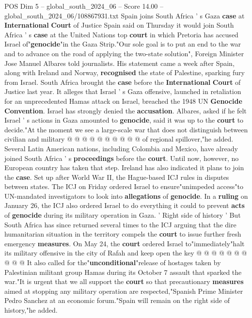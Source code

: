 \begin{textsample}{POS Dim 5 – global\_south\_2024\_06 – Score 14.00 – global\_south\_2024\_06/108867931.txt}  \label{ex:f5_pos_227}
Spain joins South Africa ' s Gaza \textbf{case} at \textbf{International} \textbf{Court} of Justice Spain said on Thursday it would join South Africa ' s \textbf{case} at the United Nations top \textbf{court} in which Pretoria has accused Israel of"\textbf{genocide}"in the Gaza Strip."Our sole goal is to put an end to the war and to advance on the road of applying the two-state solution", Foreign Minister Jose Manuel Albares told journalists.
His statement came a week after Spain, along with Ireland and Norway, \textbf{recognised} the state of Palestine, sparking fury from Israel.
South Africa brought the \textbf{case} before the \textbf{International} \textbf{Court} of Justice last year.
It alleges that Israel ' s Gaza offensive, launched in retaliation for an unprecedented Hamas attack on Israel, breached the 1948 UN \textbf{Genocide} \textbf{Convention}.
Israel has strongly denied the \textbf{accusation}.
Albares, asked if he felt Israel ' s actions in Gaza amounted to \textbf{genocide}, said it was up to the \textbf{court} to decide."At the moment we see a large-scale war that does not distinguish between civilian and military @ @ @ @ @ @ @ @ @ @ of regional spillover,"he added.
Several Latin American nations, including Colombia and Mexico, have already joined South Africa ' s \textbf{proceedings} before the \textbf{court}.
Until now, however, no European country has taken that step.
Ireland has also indicated it plans to join the \textbf{case}.
Set up after World War II, the Hague-based ICJ rules in disputes between states.
The ICJ on Friday ordered Israel to ensure"unimpeded access"to UN-mandated investigators to look into \textbf{allegations} of \textbf{genocide}.
In a \textbf{ruling} on January 26, the ICJ also ordered Israel to do everything it could to prevent \textbf{acts} of \textbf{genocide} during its military operation in Gaza. ' Right side of history ' But South Africa has since returned several times to the ICJ arguing that the dire humanitarian situation in the territory compels the \textbf{court} to issue further fresh emergency \textbf{measures}.
On May 24, the \textbf{court} ordered Israel to"immediately"halt its military offensive in the city of Rafah and keep open the key @ @ @ @ @ @ @ @ @ @ It also called for the"\textbf{unconditional}"release of hostages taken by Palestinian militant group Hamas during its October 7 assault that sparked the war."It is urgent that we all support the \textbf{court} so that precautionary \textbf{measures} aimed at stopping any military operation are respected,"Spanish Prime Minister Pedro Sanchez at an economic forum."Spain will remain on the right side of history,"he added.

\end{textsample}
